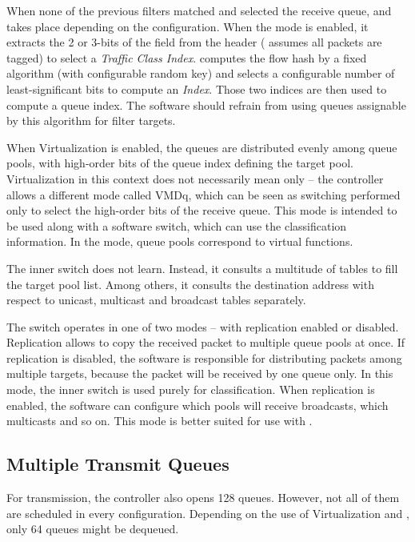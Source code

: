 When none of the previous filters matched and selected the receive queue, 
and  takes place depending on the configuration. When the  mode
is enabled, it extracts the 2 or 3-bits of the  field from the 
header ( assumes all packets are  tagged) to select
a \emph{Traffic Class Index}.  computes the flow hash by a fixed
algorithm (with configurable random key) and selects a configurable number of
least-significant bits to compute an \emph{ Index}. Those two indices are
then used to compute a queue index. The software should refrain from using queues
assignable by this algorithm for filter targets.

When Virtualization is enabled, the queues are distributed evenly among queue
pools, with high-order bits of the queue index defining the target pool.
Virtualization in this context does not necessarily mean only  -- the
controller allows a different mode called \acrfull{VMDq}, which can be seen as
switching performed only to select the high-order bits of the receive
queue. This mode is intended to be used along with a software switch, which can
use the classification information. In the  mode, queue pools
correspond to virtual functions.

The inner switch does not learn. Instead, it consults a multitude of tables to
fill the target pool list. Among others, it consults the destination 
address with respect to unicast, multicast and broadcast tables separately.

The switch operates in one of two modes -- with replication enabled or
disabled. Replication allows to copy the received packet to multiple queue
pools at once. If replication is disabled, the software is responsible for
distributing packets among multiple targets, because the packet will be
received by one queue only. In this mode, the inner switch is used purely for
classification. When replication is enabled, the software can configure
which pools will receive broadcasts, which multicasts and so on. This mode is
better suited for use with .

\subsection{Multiple Transmit Queues}

For transmission, the controller also opens 128 queues. However, not all of
them are scheduled in every configuration. Depending on the use of Virtualization
and , only 64 queues might be dequeued.

